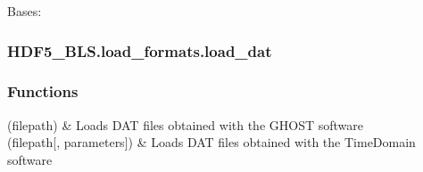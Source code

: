 \documentclass[letterpaper,10pt,english]{sphinxmanual}
\begin{document}

\begin{fulllineitems}
\label{\detokenize{_autosummary/HDF5_BLS.load_formats.errors:HDF5_BLS.load_formats.errors.LoadError_parameters}}
\pysigstartsignatures
\pysiglinewithargsret
{}
{\sphinxparamcomma {}}
{}
\pysigstopsignatures
\sphinxAtStartPar
Bases: 

\end{fulllineitems}


\sphinxstepscope


\subsubsection{HDF5\_BLS.load\_formats.load\_dat}
\label{\detokenize{_autosummary/HDF5_BLS.load_formats.load_dat:module-HDF5_BLS.load_formats.load_dat}}\label{\detokenize{_autosummary/HDF5_BLS.load_formats.load_dat:hdf5-bls-load-formats-load-dat}}\label{\detokenize{_autosummary/HDF5_BLS.load_formats.load_dat::doc}}\subsubsection*{Functions}


\begin{savenotes}\sphinxattablestart
\sphinxthistablewithglobalstyle
\sphinxthistablewithnovlinesstyle
\centering
\begin{tabulary}{\linewidth}[t]{}
\sphinxtoprule
\sphinxtableatstartofbodyhook
\sphinxAtStartPar
{\hyperref[\detokenize{_autosummary/HDF5_BLS.load_formats.load_dat:HDF5_BLS.load_formats.load_dat.load_dat_GHOST}]{}}(filepath)
&
\sphinxAtStartPar
Loads DAT files obtained with the GHOST software
\\
\sphinxhline
\sphinxAtStartPar
{\hyperref[\detokenize{_autosummary/HDF5_BLS.load_formats.load_dat:HDF5_BLS.load_formats.load_dat.load_dat_TimeDomain}]{}}(filepath{[}, parameters{]})
&
\sphinxAtStartPar
Loads DAT files obtained with the TimeDomain software
\\
\sphinxbottomrule
\end{tabulary}
\sphinxtableafterendhook\par
\sphinxattableend\end{savenotes}
\end{document}
